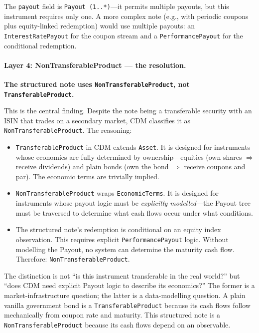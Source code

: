 \documentclass[11pt,a4paper]{article}
\begin{document}
\noindent The \texttt{payout} field is \texttt{Payout (1..*)}---it permits multiple payouts, but this instrument requires only one. A more complex note (e.g., with periodic coupons plus equity-linked redemption) would use multiple payouts: an \texttt{InterestRatePayout} for the coupon stream and a \texttt{PerformancePayout} for the conditional redemption.

\paragraph{Layer 4: NonTransferableProduct --- the resolution.}

\textbf{The structured note uses \texttt{NonTransferableProduct}, not \texttt{TransferableProduct}.}

This is the central finding. Despite the note being a transferable security with an ISIN that trades on a secondary market, CDM classifies it as \texttt{NonTransferableProduct}. The reasoning:

\begin{itemize}[nosep]
\item \texttt{TransferableProduct} in CDM extends \texttt{Asset}. It is designed for instruments whose economics are fully determined by ownership---equities (own shares $\Rightarrow$ receive dividends) and plain bonds (own the bond $\Rightarrow$ receive coupons and par). The economic terms are trivially implied.
\item \texttt{NonTransferableProduct} wraps \texttt{EconomicTerms}. It is designed for instruments whose payout logic must be \emph{explicitly modelled}---the Payout tree must be traversed to determine what cash flows occur under what conditions.
\item The structured note's redemption is conditional on an equity index observation. This requires explicit \texttt{PerformancePayout} logic. Without modelling the Payout, no system can determine the maturity cash flow. Therefore: \texttt{NonTransferableProduct}.
\end{itemize}

\noindent The distinction is not ``is this instrument transferable in the real world?'' but ``does CDM need explicit Payout logic to describe its economics?'' The former is a market-infrastructure question; the latter is a data-modelling question. A plain vanilla government bond is a \texttt{TransferableProduct} because its cash flows follow mechanically from coupon rate and maturity. This structured note is a \texttt{NonTransferableProduct} because its cash flows depend on an observable.
\end{document}
